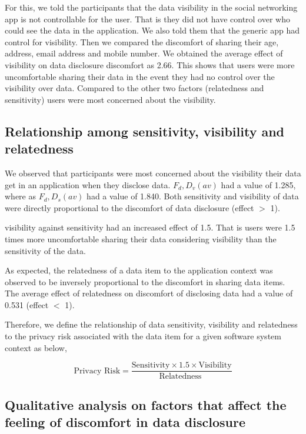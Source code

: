 \documentclass[conference]{IEEEtran}
\begin{document}
For this, we told the participants that the data visibility in the social networking app is not controllable for the user. That is they did not have control over who could see the data in the application. We also told them that the generic app had control for visibility. Then we compared the discomfort of sharing their age, address, email address and mobile number. We obtained the average effect of visibility on data disclosure discomfort as 2.66. This shows that users were more uncomfortable sharing their data in the event they had no control over the visibility over data. Compared to the other two factors (relatedness and sensitivity) users were most concerned about the visibility. 


\subsection {Relationship among sensitivity, visibility and relatedness}

We observed that participants were most concerned about the visibility their data get in an application when they disclose data. $F_d,D_v(av)$ had a value of 1.285, where as $F_d,D_s(av)$ had a value of 1.840. Both sensitivity and visibility of data were directly proportional to the discomfort of data disclosure (effect $>$ 1). 

visibility against sensitivity had an increased effect of 1.5. That is users were 1.5 times more uncomfortable sharing their data considering visibility than the sensitivity of the data.


As expected, the relatedness of a data item to the application context was observed to be inversely proportional to the discomfort in sharing data items. The average effect of relatedness on discomfort of disclosing data had a value of 0.531 (effect $<$ 1).

Therefore, we define the relationship of data sensitivity, visibility and relatedness to the privacy risk associated with the data item for a given software system context as below,

\[ \text{Privacy Risk}  =
\frac{
      \text{Sensitivity} \times 1.5 \times \text{Visibility} }
 {
       \text{Relatedness }}
\]

\subsection{Qualitative analysis on factors that affect the feeling of discomfort in data disclosure}
\end{document}
